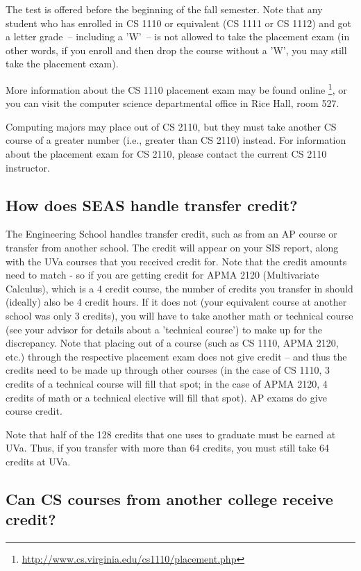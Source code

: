 \documentclass[10pt,letter,twocolumn]{book}
\newcommand{\myurl}[1]{\footnote{\scriptsize\url{#1}}}
\begin{document}
The test is offered before the beginning of the fall semester. Note
that any student who has enrolled in CS 1110 or equivalent (CS 1111 or
CS 1112) and got a letter grade~-- including a 'W'~-- is not allowed
to take the placement exam (in other words, if you enroll and then
drop the course without a 'W', you may still take the placement
exam).

More information about the CS 1110 placement exam may be found online
\myurl{http://www.cs.virginia.edu/cs1110/placement.php}, or you can
visit the computer science departmental office in Rice Hall, room 527.

Computing majors may place out of CS 2110, but they must take another
CS course of a greater number (i.e., greater than CS 2110) instead.
For information about the placement exam for CS 2110, please contact
the current CS 2110 instructor.

\subsection{How does SEAS handle transfer credit?}

The Engineering School handles transfer credit, such as from an AP
course or transfer from another school. The credit will appear on your
SIS report, along with the UVa courses that you received credit
for. Note that the credit amounts need to match - so if you are
getting credit for APMA 2120 (Multivariate Calculus), which is a
4 credit course, the number of credits you transfer in should
(ideally) also be 4 credit hours. If it does not (your equivalent
course at another school was only 3 credits), you will have to take
another math or technical course (see your advisor for details about a
'technical course') to make up for the discrepancy. Note that placing
out of a course (such as CS 1110, APMA 2120, etc.) through
the respective placement exam does not give credit – and thus the
credits need to be made up through other courses (in the case of CS
1110, 3 credits of a technical course will fill that spot; in
the case of APMA 2120, 4 credits of math or a technical elective
will fill that spot). AP exams do give course credit.

Note that half of the 128 credits that one uses to graduate must be
earned at UVa. Thus, if you transfer with more than 64 credits, you
must still take 64 credits at UVa.

\subsection{Can CS courses from another college receive credit?}
\end{document}
